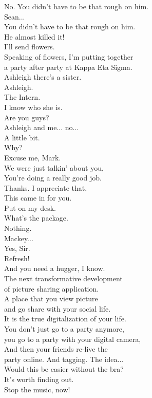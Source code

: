 \documentclass{article}
\begin{document}
\begin{multicols}{3}
No. You didn't have to be that rough on him.\\
Sean...\\
You didn't have to be that rough on him.\\
He almost killed it!\\
I'll send flowers.\\
Speaking of flowers, I'm putting together\\
a party after party at Kappa Eta Sigma.\\
Ashleigh there's a sister.\\
Ashleigh.\\
The Intern.\\
I know who she is.\\
Are you guys?\\
Ashleigh and me... no...\\
A little bit.\\
Why?\\
Excuse me, Mark.\\
We were just talkin' about you,\\
You're doing a really good job.\\
Thanks. I appreciate that.\\
This came in for you.\\
Put on my desk.\\
What's the package.\\
Nothing.\\
Mackey...\\
Yes, Sir.\\
Refresh!\\
And you need a hugger, I know.\\
The next transformative development\\
of picture sharing application.\\
A place that you view picture\\
and go share with your social life.\\
It is the true digitalization of your life.\\
You don't just go to a party anymore,\\
you go to a party with your digital camera,\\
And then your friends re-live the\\
party online. And tagging. The idea...\\
Would this be easier without the bra?\\
It's worth finding out.\\
Stop the music, now!\\

\end{multicols}
\end{document}
